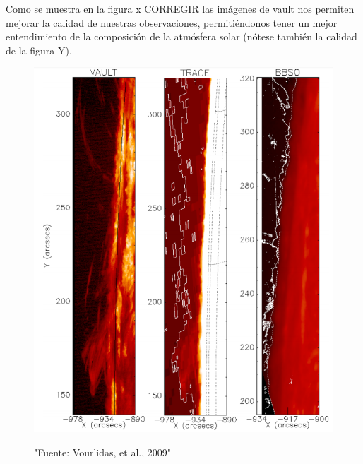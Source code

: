 \documentclass[9pt]{book}
\begin{document}
Como se muestra en la figura x CORREGIR las im\'agenes de vault nos permiten mejorar la calidad de nuestras observaciones, permiti\'endonos tener un mejor entendimiento de la composici\'on de la atm\'osfera solar (n\'otese tambi\'en la calidad de la figura Y).

\begin{figure}[h]
\caption{"Fuente: Vourlidas, et al., 2009"}
\centering
\includegraphics[scale=0.6]{vault_comparison}
\label{fig:vault_compare}
\end{figure}
\end{document}
